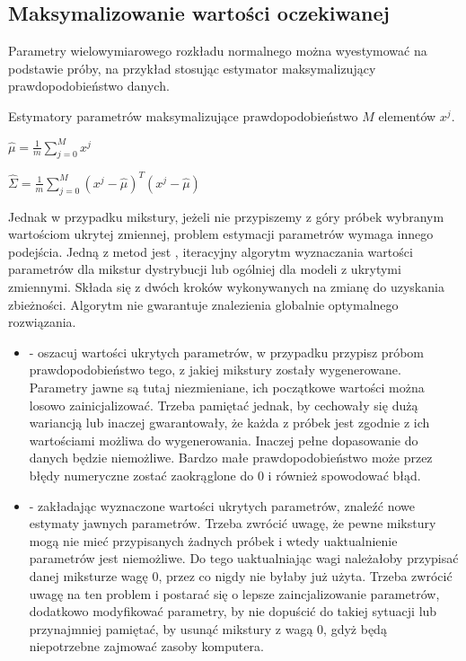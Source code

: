 \subsection{Maksymalizowanie wartości oczekiwanej}\label{sec:gmm}

Parametry wielowymiarowego rozkładu normalnego można wyestymować na podstawie próby, na przykład
stosując estymator maksymalizujący prawdopodobieństwo danych.

Estymatory parametrów maksymalizujące prawdopodobieństwo $M$ elementów $x^j$.

$\hat{\mu} = \frac{1}{m} \sum_{j=0}^M x^{j}$

$\hat{\Sigma} = \frac{1}{m} \sum_{j=0}^M (x^{j} - \hat{\mu})^T (x^{j} - \hat{\mu})$

Jednak w przypadku mikstury, jeżeli nie przypiszemy z góry próbek wybranym wartościom ukrytej zmiennej, problem
estymacji parametrów wymaga innego podejścia. Jedną z metod jest , iteracyjny
algorytm wyznaczania wartości parametrów dla mikstur dystrybucji lub ogólniej dla modeli z ukrytymi zmiennymi.
Składa się z dwóch kroków wykonywanych na zmianę do uzyskania zbieżności.  Algorytm nie gwarantuje znalezienia 
globalnie optymalnego rozwiązania.

\begin{itemize}
    \item {} - oszacuj wartości ukrytych parametrów, w przypadku  przypisz próbom
        prawdopodobieństwo tego, z jakiej mikstury zostały wygenerowane. Parametry jawne są tutaj niezmieniane,
        ich początkowe wartości można losowo zainicjalizować. Trzeba pamiętać jednak, by cechowały się dużą wariancją
        lub inaczej gwarantowały, że każda z próbek jest zgodnie z ich wartościami możliwa do wygenerowania. Inaczej
        pełne dopasowanie do danych będzie niemożliwe. Bardzo małe prawdopodobieństwo może przez błędy numeryczne 
        zostać zaokrąglone do $0$ i również spowodować błąd.
    \item {} - zakładając wyznaczone wartości ukrytych parametrów, znaleźć nowe  estymaty
        jawnych parametrów. Trzeba zwrócić uwagę, że pewne mikstury mogą nie mieć przypisanych żadnych próbek
        i wtedy uaktualnienie parametrów jest niemożliwe. Do tego uaktualniając wagi  należałoby
        przypisać danej miksturze wagę $0$, przez co nigdy nie byłaby już użyta. Trzeba zwrócić uwagę na ten problem
        i postarać się o lepsze zaincjalizowanie parametrów, dodatkowo modyfikować parametry, by nie dopuścić
        do takiej sytuacji lub przynajmniej pamiętać, by usunąć mikstury z wagą $0$, gdyż będą niepotrzebne zajmować
        zasoby komputera.
\end{itemize}

